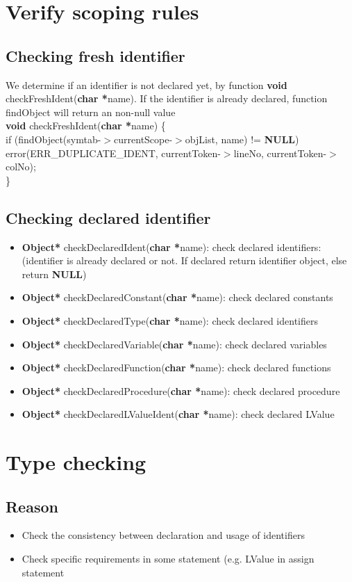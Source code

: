 \documentclass[12pt, a4paper]{report}
\begin{document}
		\section{Verify scoping rules}
			\subsection{Checking fresh identifier}
				\tab We determine if an identifier is not declared yet, by function \textbf{void} checkFreshIdent(\textbf{char *}name). If the identifier is already declared, function findObject will return an non-null value\\
				\textbf{void} checkFreshIdent(\textbf{char *}name) \{\\
  				if (findObject(symtab-$>$currentScope-$>$objList, name) != \textbf{NULL})
    			error(ERR\_DUPLICATE\_IDENT, currentToken-$>$lineNo, currentToken-$>$colNo);\\
\}
			\subsection{Checking declared identifier}
				\begin{itemize}
					\item \textbf{Object*} checkDeclaredIdent(\textbf{char *}name): check declared identifiers: (identifier is already declared or not. If declared return identifier object, else return \textbf{NULL})
					\item \textbf{Object*} checkDeclaredConstant(\textbf{char *}name): check declared constants
					\item \textbf{Object*} checkDeclaredType(\textbf{char *}name): check declared identifiers
					\item \textbf{Object*} checkDeclaredVariable(\textbf{char *}name): check declared variables
					\item \textbf{Object*} checkDeclaredFunction(\textbf{char *}name): check declared functions
					\item \textbf{Object*} checkDeclaredProcedure(\textbf{char *}name): check declared procedure
					\item \textbf{Object*} checkDeclaredLValueIdent(\textbf{char *}name): check declared LValue
				\end{itemize}
		\section{Type checking}
			\subsection{Reason}
				\begin{itemize}
					\item Check the consistency between declaration and usage of identifiers
					\item Check specific requirements in some statement (e.g. LValue in assign statement
				\end{itemize}
\end{document}
